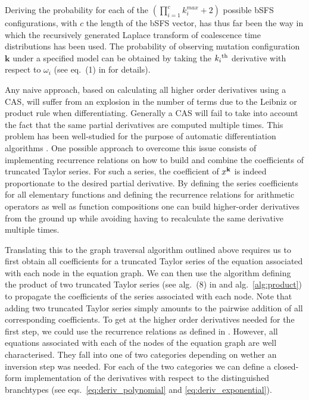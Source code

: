 \documentclass[10pt, a4]{article}
\begin{document}
Deriving the probability for each of the $(\prod_{i=1}^{c} k_i^{max} + 2)$ possible bSFS configurations, with $c$ the length of the bSFS vector, has thus far been the way in which the recursively generated Laplace transform of coalescence time distributions has been used. The probability of observing mutation configuration $\boldsymbol{k}$ under a specified model can be obtained by taking the $k_i \textsuperscript{th}$ derivative with respect to $\omega_i$ (see eq.\ (1) in \citet{Lohse2011} for details).

Any naive approach, based on calculating all higher order derivatives using a CAS, will suffer from an explosion in the number of terms due to the Leibniz or product rule when differentiating. Generally a CAS will fail to take into account the fact that the same partial derivatives are computed multiple times. This problem has been well-studied for the purpose of automatic differentiation algorithms \citep{Neidinger1992, Neidinger1995, Griewank2000, Bettencourt2019}. One possible approach to overcome this issue consists of implementing recurrence relations on how to build and combine the coefficients of truncated Taylor series. For such a series, the coefficient of $x^\bold{k}$ is indeed proportionate to the desired partial derivative. By defining the series coefficients for all elementary functions and defining the recurrence relations for arithmetic operators as well as function compositions one can build higher-order derivatives from the ground up while avoiding having to recalculate the same derivative multiple times\citep{Neidinger2013}.

Translating this to the graph traversal algorithm outlined above requires us to first obtain all coefficients for a truncated Taylor series of the equation associated with each node in the equation graph. We can then use the algorithm defining the product of two truncated Taylor series (see alg.\ (8) in \citet{Neidinger2013} and alg.\ \ref{alg:product}) to propagate the coefficients of the series associated with each node. Note that adding two truncated Taylor series simply amounts to the pairwise addition of all corresponding coefficients. To get at the higher order derivatives needed for the first step, we could use the recurrence relations as defined in \citet{Neidinger2013}. However, all equations associated with each of the nodes of the equation graph are well characterised. They fall into one of two categories depending on wether an inversion step was needed. For each of the two categories we can define a closed-form implementation of the derivatives with respect to the distinguished branchtypes (see eqs.\ \ref{eq:deriv_polynomial} and \ref{eq:deriv_exponential}). 
\end{document}
